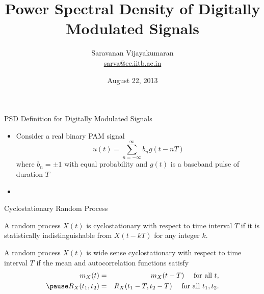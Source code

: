 \documentclass[t]{beamer}
\title[EE 703 DMT]{Power Spectral Density of Digitally Modulated Signals}
\author[Saravanan V]
{
  Saravanan Vijayakumaran\\
  \href{mailto:sarva@ee.iitb.ac.in}{sarva@ee.iitb.ac.in}
}
\institute[IIT Bombay]
{
  Department of Electrical Engineering\\
  Indian Institute of Technology Bombay
}
\date{August 22, 2013}
\begin{document}
\begin{frame}
  \titlepage
\end{frame}

\begin{frame}{PSD Definition for Digitally Modulated Signals}
  \footnotesize
  \pause
  \begin{itemize}
    \item Consider a real binary PAM signal
      \begin{equation*}
        u(t) = \sum_{n=-\infty}^{\infty} b_n g(t-nT)
      \end{equation*}
      \pause
      where $b_n = \pm 1$ with equal probability and $g(t)$ is a baseband pulse of duration $T$
      \pause
      \begin{figure}
        \centering
      \end{figure}
    \pause
    \item {} 
    \pause
  \end{itemize}
  \normalsize
\end{frame}

\begin{frame}{Cyclostationary Random Process}
  \footnotesize
  \pause
  \begin{definition}[Cyclostationary RP]
    A random process $X(t)$ is cyclostationary with respect to time interval $T$ if \pause it is statistically indistinguishable from $X(t-kT)$ for any integer $k$.
  \end{definition}
  \pause
  \begin{definition}
    \pause
    A random process $X(t)$ is wide sense cyclostationary with respect to time interval $T$ if \pause the mean and autocorrelation functions satisfy
    \pause
    \begin{eqnarray*}
      m_X(t) & = & m_X(t-T) \ \ \ \ \text{for all } t,\\
      \pause
      R_X(t_1,t_2) & = & R_X(t_1-T,t_2-T) \ \ \ \ \text{for all } t_1,t_2.
    \end{eqnarray*}
  \end{definition}
  \normalsize
\end{frame}
\end{document}
